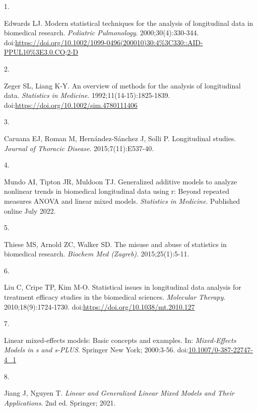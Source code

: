 \documentclass[
]{article}
\newlength{\cslhangindent}
\newlength{\csllabelwidth}
\newlength{\cslentryspacingunit} %
\newenvironment{CSLReferences}[2] %
 {%
  \setlength{\parindent}{0pt}
  \ifodd #1
  \let\oldpar\par
  \def\par{\hangindent=\cslhangindent\oldpar}
  \fi
  \setlength{\parskip}{#2\cslentryspacingunit}
 }%
 {}
\newcommand{\CSLLeftMargin}[1]{\parbox[t]{\csllabelwidth}{#1}}
\newcommand{\CSLRightInline}[1]{\parbox[t]{\linewidth - \csllabelwidth}{#1}\break}
\begin{document}
\hypertarget{refs}{}
\begin{CSLReferences}{0}{0}
\leavevmode{}%
\CSLLeftMargin{1. }%
\CSLRightInline{Edwards LJ. Modern statistical techniques for the
analysis of longitudinal data in biomedical research. \emph{Pediatric
Pulmonology}. 2000;30(4):330-344.
doi:\url{https://doi.org/10.1002/1099-0496(200010)30:4\%3C330::AID-PPUL10\%3E3.0.CO;2-D}}

\leavevmode{}%
\CSLLeftMargin{2. }%
\CSLRightInline{Zeger SL, Liang K-Y. An overview of methods for the
analysis of longitudinal data. \emph{Statistics in Medicine}.
1992;11(14-15):1825-1839.
doi:\url{https://doi.org/10.1002/sim.4780111406}}

\leavevmode{}%
\CSLLeftMargin{3. }%
\CSLRightInline{Caruana EJ, Roman M, Hernández-Sánchez J, Solli P.
Longitudinal studies. \emph{Journal of Thoracic Disease}.
2015;7(11):E537-40.}

\leavevmode{}%
\CSLLeftMargin{4. }%
\CSLRightInline{Mundo AI, Tipton JR, Muldoon TJ. Generalized additive
models to analyze nonlinear trends in biomedical longitudinal data using
r: Beyond repeated measures {ANOVA} and linear mixed models.
\emph{Statistics in Medicine}. Published online July 2022.}

\leavevmode{}%
\CSLLeftMargin{5. }%
\CSLRightInline{Thiese MS, Arnold ZC, Walker SD. The misuse and abuse of
statistics in biomedical research. \emph{Biochem Med (Zagreb)}.
2015;25(1):5-11.}

\leavevmode{}%
\CSLLeftMargin{6. }%
\CSLRightInline{Liu C, Cripe TP, Kim M-O. Statistical issues in
longitudinal data analysis for treatment efficacy studies in the
biomedical sciences. \emph{Molecular Therapy}. 2010;18(9):1724-1730.
doi:\url{https://doi.org/10.1038/mt.2010.127}}

\leavevmode{}%
\CSLLeftMargin{7. }%
\CSLRightInline{Linear mixed-effects models: Basic concepts and
examples. In: \emph{Mixed-Effects Models in s and s-PLUS}. Springer New
York; 2000:3-56.
doi:\href{https://doi.org/10.1007/0-387-22747-4_1}{10.1007/0-387-22747-4\_1}}

\leavevmode{}%
\CSLLeftMargin{8. }%
\CSLRightInline{Jiang J, Nguyen T. \emph{Linear and Generalized Linear
Mixed Models and Their Applications}. 2nd ed. Springer; 2021.}


\end{CSLReferences}
\end{document}
